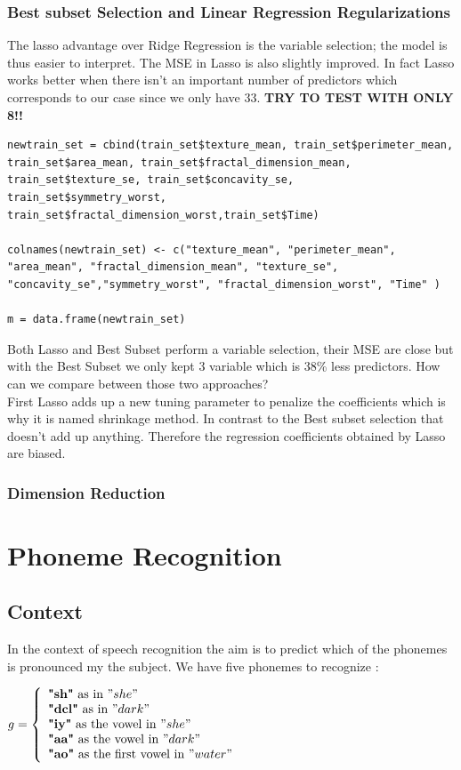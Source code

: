 \documentclass[]{report}
\begin{document}
\subsection{Best subset Selection and Linear Regression Regularizations}
The lasso advantage over Ridge Regression is the variable selection; the model is thus easier to interpret. The MSE in Lasso is also slightly improved. In fact Lasso works better when there isn't an important number of predictors which corresponds to our case since we only have 33.
\textbf{TRY TO TEST WITH ONLY 8!!}

\begin{lstlisting}
newtrain_set = cbind(train_set$texture_mean, train_set$perimeter_mean, train_set$area_mean, train_set$fractal_dimension_mean,
train_set$texture_se, train_set$concavity_se, train_set$symmetry_worst, train_set$fractal_dimension_worst,train_set$Time)

colnames(newtrain_set) <- c("texture_mean", "perimeter_mean", "area_mean", "fractal_dimension_mean", "texture_se",
"concavity_se","symmetry_worst", "fractal_dimension_worst", "Time" )

m = data.frame(newtrain_set)
\end{lstlisting}

Both Lasso and Best Subset perform a variable selection, their MSE are close but with the Best Subset we only kept 3 variable which is 38\% less predictors. How can we compare between those two approaches?\\
First Lasso adds up a new tuning parameter to penalize the coefficients which is why it is named shrinkage method. In contrast to the Best subset selection that doesn't add up anything. Therefore the regression coefficients obtained by Lasso are biased.
\subsection{Dimension Reduction}



\chapter{Phoneme Recognition}
\section{Context}
In the context of speech recognition the aim is to predict which of the phonemes is pronounced my the subject. We have five phonemes to recognize :\\ 
\begin{center}
	$g = \left\{
	\begin{array}{l}
	\textbf{"sh"} \text{ as in } "she" \\
	\textbf{"dcl"} \text{ as in } "dark" \\
	\textbf{"iy"} \text{ as the vowel in } "she" \\ 
	\textbf{"aa"} \text{ as the vowel in }  "dark"\\
	\textbf{"ao"} \text{ as the first vowel in }  "water"
	\end{array}
	\right.$
\end{center}
\end{document}
